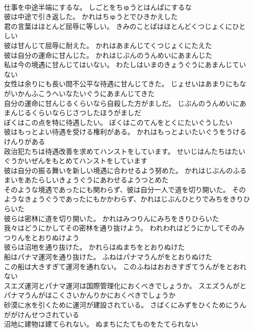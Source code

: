 \documentclass[8pt]{extreport}
\begin{document}
\begin{CJK}{UTF8}{min}
\\	仕事を中途半端にするな。	しごとをちゅうとはんぱにするな 
\\	彼は中途で引き返した。	かれはちゅうとでひきかえした 
\\	君の言葉はほとんど屈辱に等しい。	きみのことばはほとんどくつじょくにひとしい 
\\	彼は甘んじて屈辱に耐えた。	かれはあまんじてくつじょくにたえた 
\\	彼は自分の運命に甘んじた。	かれはじぶんのうんめいにあまんじた 
\\	私は今の境遇に甘んじてはいない。	わたしはいまのきょうぐうにあまんじていない 
\\	女性は余りにも長い間不公平な待遇に甘んじてきた。	じょせいはあまりにもながいかんふこうへいなたいぐうにあまんじてきた 
\\	自分の運命に甘んじるくらいなら自殺した方がましだ。	じぶんのうんめいにあまんじるくらいならじさつしたほうがましだ 
\\	ぼくはこの点を特に待遇したい。	ぼくはこのてんをとくにたいぐうしたい 
\\	彼はもっとよい待遇を受ける権利がある。	かれはもっとよいたいぐうをうけるけんりがある 
\\	政治犯たちは待遇改善を求めてハンストをしています。	せいじはんたちはたいぐうかいぜんをもとめてハンストをしています 
\\	彼は自分の振る舞いを新しい境遇に合わせるよう努めた。	かれはじぶんのふるまいをあたらしいきょうぐうにあわせるようつとめた 
\\	そのような境遇であったにも関わらず、彼は自分一人で道を切り開いた。	そのようなきょうぐうであったにもかかわらず、かれはじぶんひとりでみちをきりひらいた 
\\	彼らは密林に道を切り開いた。	かれはみつりんにみちをきりひらいた 
\\	我々はどうにかしてその密林を通り抜けよう。	われわれはどうにかしてそのみつりんをとおりぬけよう 
\\	彼らは沼地を通り抜けた。	かれらはぬまちをとおりぬけた 
\\	船はパナマ運河を通り抜けた。	ふねはパナマうんがをとおりぬけた 
\\	この船は大きすぎて運河を通れない。	このふねはおおきすぎてうんがをとおれない 
\\	スエズ運河とパナマ運河は国際管理化におくべきでしょうか。	スエズうんがとパナマうんがはこくさいかんりかにおくべきでしょうか 
\\	砂漠に水を引くために運河が建設されている。	さばくにみずをひくためにうんががけんせつされている 
\\	沼地に建物は建てられない。	ぬまちにたてものをたてられない 

\end{CJK}
\end{document}
